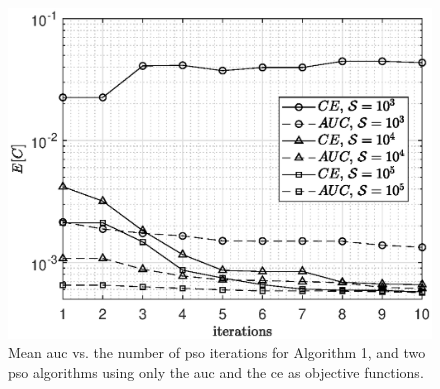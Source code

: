 \documentclass[conference,final]{IEEEtran}
\begin{document}

 
\begin{figure} 
    \centering
    \includegraphics[width=1\columnwidth]{res_PSO_comp.eps}
    \caption{Mean \ac{auc} vs. the number of \ac{pso} iterations for Algorithm 1, and two \ac{pso} algorithms using only the  \ac{auc} and the \ac{ce} as objective functions. }
    \label{fig:CEvsAUC}
\end{figure}
\end{document}
